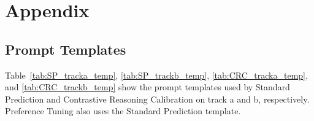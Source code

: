 \documentclass[11pt]{article}
\begin{document}
%


\appendix

\section{Appendix}
\subsection{Prompt Templates}
\label{sec:app_PT}

Table~\ref{tab:SP_tracka_temp}, \ref{tab:SP_trackb_temp}, \ref{tab:CRC_tracka_temp}, and \ref{tab:CRC_trackb_temp} show the prompt templates used by Standard Prediction and Contrastive Reasoning Calibration on track a and b, respectively. Preference Tuning also uses the Standard Prediction template.
\end{document}
